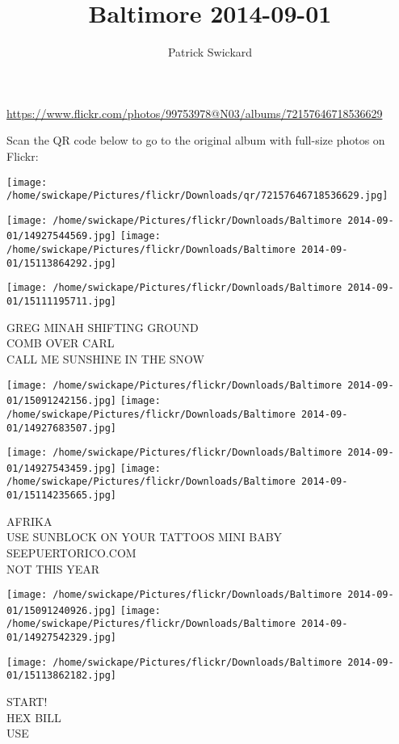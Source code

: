 \documentclass[10pt,letterpaper]{article}
\title{Baltimore 2014-09-01}
\author{Patrick Swickard}
\date{}
\begin{document}
\maketitle

\url{https://www.flickr.com/photos/99753978@N03/albums/72157646718536629}

Scan the QR code below to go to the original album with full-size photos on Flickr:

\texttt{[image: /home/swickape/Pictures/flickr/Downloads/qr/72157646718536629.jpg]}
\pagebreak

\texttt{[image: /home/swickape/Pictures/flickr/Downloads/Baltimore 2014-09-01/14927544569.jpg]}
\texttt{[image: /home/swickape/Pictures/flickr/Downloads/Baltimore 2014-09-01/15113864292.jpg]}

\vspace{0.25in}
\texttt{[image: /home/swickape/Pictures/flickr/Downloads/Baltimore 2014-09-01/15111195711.jpg]}

GREG MINAH SHIFTING GROUND\\
COMB OVER CARL\\
CALL ME SUNSHINE IN THE SNOW
\pagebreak

\texttt{[image: /home/swickape/Pictures/flickr/Downloads/Baltimore 2014-09-01/15091242156.jpg]}
\texttt{[image: /home/swickape/Pictures/flickr/Downloads/Baltimore 2014-09-01/14927683507.jpg]}

\texttt{[image: /home/swickape/Pictures/flickr/Downloads/Baltimore 2014-09-01/14927543459.jpg]}
\texttt{[image: /home/swickape/Pictures/flickr/Downloads/Baltimore 2014-09-01/15114235665.jpg]}

AFRIKA\\
USE SUNBLOCK ON YOUR TATTOOS MINI BABY\\
SEEPUERTORICO.COM\\
NOT THIS YEAR
\pagebreak

\texttt{[image: /home/swickape/Pictures/flickr/Downloads/Baltimore 2014-09-01/15091240926.jpg]}
\texttt{[image: /home/swickape/Pictures/flickr/Downloads/Baltimore 2014-09-01/14927542329.jpg]}

\vspace{0.25in}
\texttt{[image: /home/swickape/Pictures/flickr/Downloads/Baltimore 2014-09-01/15113862182.jpg]}

START!\\
HEX BILL\\
USE
\pagebreak
\end{document}
